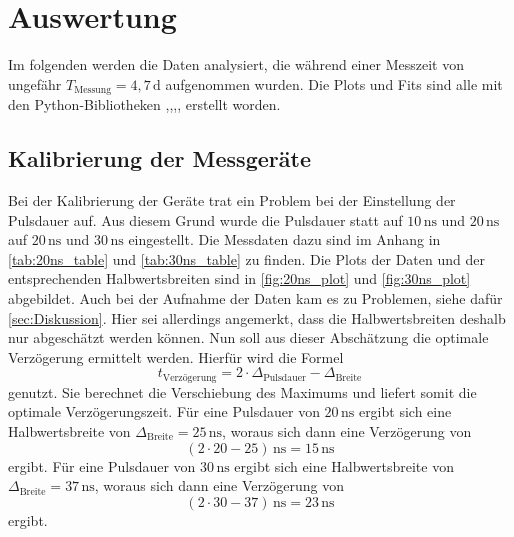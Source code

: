 \section{Auswertung}
\label{sec:Auswertung}

Im folgenden werden die Daten analysiert, die während einer Messzeit von ungefähr $T_\text{Messung} = 4,7  \, \unit\day$ aufgenommen wurden.
Die Plots und Fits sind alle mit den Python-Bibliotheken \cite{matplotlib},\cite{numpy},\cite{scipy},\cite{uncertainties},\cite{reback2020pandas} erstellt worden.
\subsection{Kalibrierung der Messgeräte}

Bei der Kalibrierung der Geräte trat ein Problem bei der Einstellung der Pulsdauer auf.
Aus diesem Grund wurde die Pulsdauer statt auf $10 \, \unit{\nano\second}$ und $20 \, \unit{\nano\second}$ auf $20 \, \unit{\nano\second}$ und $30 \, \unit{\nano\second}$ eingestellt.
Die Messdaten dazu sind im Anhang in \autoref{tab:20ns_table} und \autoref{tab:30ns_table} zu finden.
Die Plots der Daten und der entsprechenden Halbwertsbreiten sind in \autoref{fig:20ns_plot} und \autoref{fig:30ns_plot} abgebildet.
Auch bei der Aufnahme der Daten kam es zu Problemen, siehe dafür \autoref{sec:Diskussion}.
Hier sei allerdings angemerkt, dass die Halbwertsbreiten deshalb nur abgeschätzt werden können.
Nun soll aus dieser Abschätzung die optimale Verzögerung ermittelt werden.
Hierfür wird die Formel
\begin{equation*}
    t_\text{Verzögerung} = 2 \cdot \Delta_\text{Pulsdauer} - \Delta_\text{Breite}
\end{equation*}
genutzt. Sie berechnet die Verschiebung des Maximums und liefert somit die optimale Verzögerungszeit.
Für eine Pulsdauer von $20 \, \unit{\nano\second}$ ergibt sich eine Halbwertsbreite von $\Delta_\text{Breite} = 25 \, \unit{\nano\second}$, woraus sich dann eine Verzögerung von
\begin{equation*}
    (2 \cdot 20 - 25) \, \unit{\nano\second} = 15 \, \unit{\nano\second}
\end{equation*}
ergibt.
Für eine Pulsdauer von $30 \, \unit{\nano\second}$ ergibt sich eine Halbwertsbreite von $\Delta_\text{Breite} = 37 \, \unit{\nano\second}$, woraus sich dann eine Verzögerung von
\begin{equation*}
    (2 \cdot 30 - 37) \, \unit{\nano\second} = 23 \, \unit{\nano\second}
\end{equation*}
ergibt.

